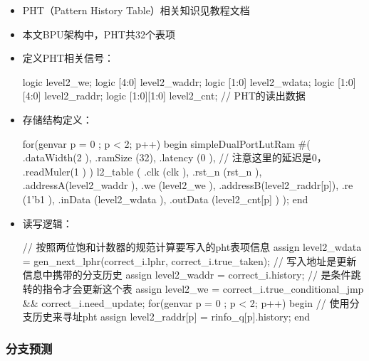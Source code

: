 \begin{itemize}
\item
  PHT（Pattern History Table）相关知识见教程文档
\item
  本文BPU架构中，PHT共32个表项
\item
  定义PHT相关信号：

\begin{CodeBlock}[language=BookSystemVerilog]
logic level2_we;
logic [4:0] level2_waddr;
logic [1:0] level2_wdata;
logic [1:0][4:0] level2_raddr;
logic [1:0][1:0] level2_cnt;  // PHT的读出数据
\end{CodeBlock}
\item
  存储结构定义：

\begin{CodeBlock}[language=BookSystemVerilog]
for(genvar p = 0 ; p < 2; p++) begin
  simpleDualPortLutRam #(
    .dataWidth(2 ),
    .ramSize  (32),
    .latency  (0 ),  // 注意这里的延迟是0，
    .readMuler(1 )
  ) l2_table (
    .clk     (clk            ),
    .rst_n   (rst_n          ),
    .addressA(level2_waddr   ),
    .we      (level2_we      ),
    .addressB(level2_raddr[p]),
    .re      (1'b1           ),
    .inData  (level2_wdata   ),
    .outData (level2_cnt[p]  )
  );
end
\end{CodeBlock}
\item
  读写逻辑：

\begin{CodeBlock}[language=BookSystemVerilog]
// 按照两位饱和计数器的规范计算要写入的pht表项信息
assign level2_wdata = gen_next_lphr(correct_i.lphr, correct_i.true_taken);
// 写入地址是更新信息中携带的分支历史
assign level2_waddr = correct_i.history;
// 是条件跳转的指令才会更新这个表
assign level2_we = correct_i.true_conditional_jmp && correct_i.need_update;
for(genvar p = 0 ; p < 2; p++) begin
  // 使用分支历史来寻址pht
  assign level2_raddr[p] = rinfo_q[p].history;
end
\end{CodeBlock}
\end{itemize}

\subsubsection{分支预测}\label{sec:04-advanced-cpu-008}


